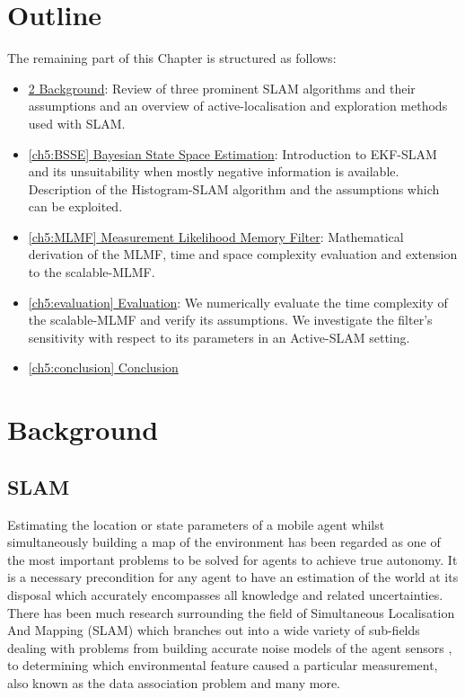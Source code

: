 \section{Outline}


The remaining part of this Chapter is structured as follows:


\begin{itemize}
 \item \hyperref[ch5:background]{\ref{ch5:background} Background}: Review of three prominent SLAM algorithms
 and their assumptions and an overview of active-localisation and exploration methods used with SLAM.
 \item \hyperref[ch5:BSSE]{\ref{ch5:BSSE} Bayesian State Space Estimation}:  Introduction to EKF-SLAM and
 its unsuitability when mostly negative information is available. Description 
 of the Histogram-SLAM algorithm and the assumptions which can be exploited.
 \item \hyperref[ch5:MLMF]{\ref{ch5:MLMF} Measurement Likelihood Memory Filter}:
 Mathematical derivation of the MLMF, time and space complexity evaluation and extension to 
 the scalable-MLMF.
 \item \hyperref[ch5:evaluation]{\ref{ch5:evaluation} Evaluation}:
 We numerically evaluate the time complexity of the scalable-MLMF and verify its assumptions.
 We investigate the filter's sensitivity with respect to its parameters in an Active-SLAM setting.
 \item \hyperref[ch5:conclusion]{\ref{ch5:conclusion} Conclusion}
\end{itemize}

\section{Background}\label{ch5:background}

\subsection{SLAM}

Estimating the location or state parameters of a mobile agent whilst simultaneously building a map of the environment has been
regarded as one of the most important problems to be solved for agents to achieve true autonomy. It is a necessary precondition for 
any agent to have an estimation of the world at its disposal which accurately encompasses all knowledge and related uncertainties. 
There has been much research surrounding the field of Simultaneous Localisation And Mapping (SLAM) which branches out into a wide variety of sub-fields 
dealing with problems from building accurate noise models of the agent sensors \cite{Plagemann07gaussianbeam}, to determining which environmental 
feature caused a particular measurement, also known as the data association problem \cite{DataAssociation2003} and many more. 

